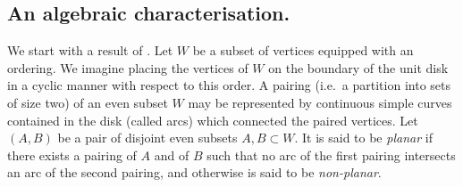 \documentclass{article}
\numberwithin{equation}{section}
\theoremstyle{definition}
\theoremstyle{definition}
\theoremstyle{remark}
\begin{document}
\subsection{An algebraic characterisation. }We start with a result of \cite{Lis22a}. Let $W$ be a subset of vertices equipped with an ordering. We imagine placing the vertices of $W$ on the boundary of the unit disk in a cyclic manner with respect to this order. A pairing (i.e.~a partition into sets of size two) of an even subset $W$ may be represented by continuous simple curves contained in the disk (called arcs) which connected the paired vertices. Let $(A,B)$ be a pair of disjoint even subsets $A,B \subset W$. It is said to be \emph{planar} if there exists a pairing of $A$ and of $B$ such that no arc of the first pairing intersects an arc of the second pairing, and otherwise is said to be \emph{non-planar}.  
\end{document}
